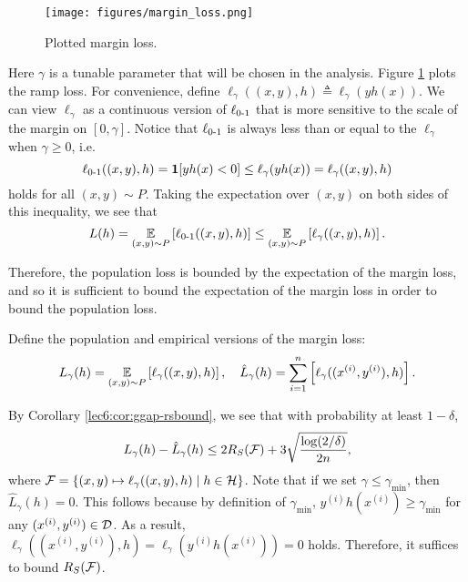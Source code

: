 \begin{figure}[ht!]
    \begin{center}
  \texttt{[image: figures/margin\_loss.png]}
  \end{center}
  \caption{Plotted margin loss.}
  \label{lec6:fig:marginloss}
\end{figure}
Here $\gamma$ is a tunable parameter that will be chosen in the analysis. Figure \ref{lec6:fig:marginloss} plots the ramp loss. For convenience, define $\ell_\gamma((x,y), h) \triangleq \ell_\gamma(yh(x))$. We can view $\ell_\gamma$ as a continuous version of $\ell_{\textup{0-1}}$ that is more sensitive to the scale of the margin on $[0,\gamma]$. Notice that $\ell_{\textup{0-1}}$ is always less than or equal to the $\ell_\gamma$ when $\gamma\geq 0$, i.e.
\begin{equation}
    \ell_{\textup{0-1}}((x,y), h) = \mathbf{1}[yh(x) < 0]\leq \ell_\gamma(yh(x)) =\ell_\gamma ((x,y), h)
\end{equation}
holds for all $(x,y)\sim P$. Taking the expectation over $(x,y)$ on both sides of this inequality, we see that
\begin{equation}
    L(h) = \operatorname*{\mathbb{E}}_{(x,y)\sim P} \left[ \ell_{\textup{0-1}}((x,y), h) \right] \leq \operatorname*{\mathbb{E}}_{(x,y)\sim P} \left[ \ell_\gamma ((x,y), h) \right].
\end{equation}

Therefore, the population loss is bounded by the expectation of the margin loss, and so it is sufficient to bound the expectation of the margin loss in order to bound the population loss.

Define the population and empirical versions of the margin loss:
\begin{equation}
L_\gamma(h) = \operatorname*{\mathbb{E}}_{(x,y)\sim P}\left[ \ell_\gamma((x,y), h)\right], \quad \hat{L}_\gamma(h) = \sum_{i=1}^n\left [\ell_\gamma((x^{(i)},y^{(i)}), h)\right].
\end{equation}

By Corollary \ref{lec6:cor:ggap-rsbound}, we see that with probability at least $1-\delta$,
\begin{equation}
L_\gamma(h) - \hat{L}_\gamma(h)\leq 2R_S(\mathcal F) + 3\sqrt{\frac{\log (2/\delta)}{2n}},
\end{equation}
where $\mathcal F = \{(x,y)\mapsto \ell_\gamma((x,y), h)\mid h\in\mathcal H\}$. Note that if we set $\gamma\leq \gamma_{\min}$, then $\hat{L}_{\gamma}(h) = 0$. This follows because by definition of $\gamma_{\min}$, $y^{(i)}h(x^{(i)})\geq \gamma_{\min}$ for any $(x^{(i)}, y^{(i)})\in \mathcal D$. As a result, $\ell_\gamma((x^{(i)}, y^{(i)}), h) = \ell_\gamma(y^{(i)}h(x^{(i)})) = 0$ holds. Therefore, it suffices to bound $R_S(\mathcal F)$.

